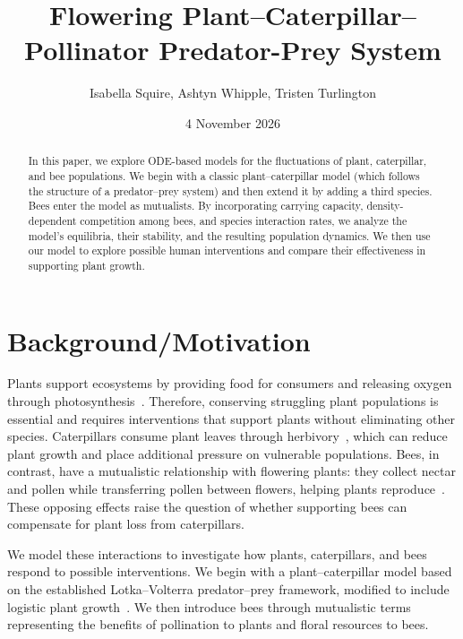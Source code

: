 \documentclass[11pt]{amsart}
\begin{document}
\title{Flowering Plant--Caterpillar--Pollinator Predator-Prey System}
\author{Isabella Squire, Ashtyn Whipple, Tristen Turlington}

\date{4 November 2026} %

\maketitle %

\begin{abstract}
In this paper, we explore ODE-based models for the fluctuations of plant, caterpillar, and bee populations. We begin with a classic plant--caterpillar model (which follows the structure of a predator--prey system) and then extend it by adding a third species. Bees enter the model as mutualists. By incorporating carrying capacity, density-dependent competition among bees, and species interaction rates, we analyze the model's equilibria, their stability, and the resulting population dynamics. We then use our model to explore possible human interventions and compare their effectiveness in supporting plant growth.
\end{abstract}

\section{Background/Motivation}

Plants support ecosystems by providing food for consumers and releasing oxygen through photosynthesis~\cite{johnson2016}. Therefore, conserving struggling plant populations is essential and requires interventions that support plants without eliminating other species. Caterpillars consume plant leaves through herbivory~\cite{grant2022}, which can reduce plant growth and place additional pressure on vulnerable populations. Bees, in contrast, have a mutualistic relationship with flowering plants: they collect nectar and pollen while transferring pollen between flowers, helping plants reproduce~\cite{revilla2015}. These opposing effects raise the question of whether supporting bees can compensate for plant loss from caterpillars.

We model these interactions to investigate how plants, caterpillars, and bees respond to possible interventions. We begin with a plant--caterpillar model based on the established Lotka--Volterra predator--prey framework, modified to include logistic plant growth~\cite{grunert2021}. We then introduce bees through mutualistic terms representing the benefits of pollination to plants and floral resources to bees.
\end{document}
